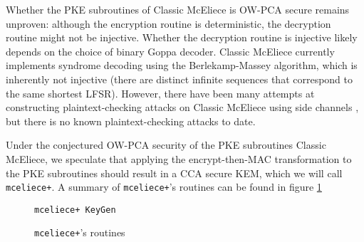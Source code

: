 \documentclass[runningheads]{llncs}
\begin{document}
Whether the PKE subroutines of Classic McEliece is OW-PCA secure remains unproven: although the encryption routine is deterministic, the decryption routine might not be injective. Whether the decryption routine is injective likely depends on the choice of binary Goppa decoder. Classic McEliece currently implements syndrome decoding using the Berlekamp-Massey algorithm, which is inherently not injective (there are distinct infinite sequences that correspond to the same shortest LFSR). However, there have been many attempts at constructing plaintext-checking attacks on Classic McEliece using side channels \cite{DBLP:journals/tches/UenoXTITH22}\cite{DBLP:journals/tches/TanakaUXITH23}, but there is no known plaintext-checking attacks to date.

Under the conjectured OW-PCA security of the PKE subroutines Classic McEliece, we speculate that applying the encrypt-then-MAC transformation to the PKE subroutines should result in a CCA secure KEM, which we will call \texttt{mceliece+}. A summary of \texttt{mceliece+}'s routines can be found in figure \ref{fig:mceliece-plus-routines}

\begin{figure}[H]
    \centering
    \begin{algorithm}[H]
        \caption*{\texttt{mceliece+ KeyGen}}
        \begin{algorithmic}
            \State 
        \end{algorithmic}
    \end{algorithm}
    \caption{\texttt{mceliece+}'s routines}\label{fig:mceliece-plus-routines}
\end{figure}

\end{document}
